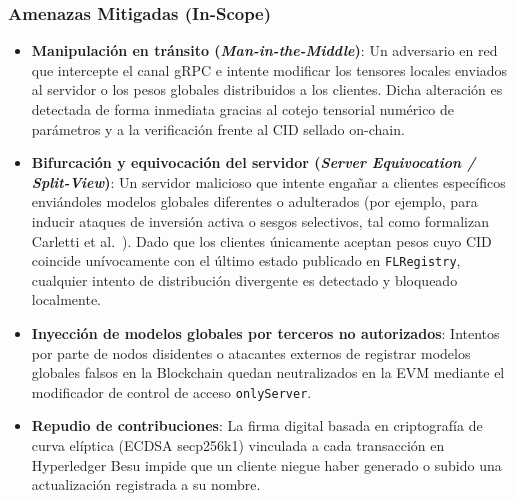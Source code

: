 \subsubsection{Amenazas Mitigadas (In-Scope)}
\begin{itemize}
    \item \textbf{Manipulación en tránsito (\textit{Man-in-the-Middle})}: Un adversario en red que intercepte el canal gRPC e intente modificar los tensores locales enviados al servidor o los pesos globales distribuidos a los clientes. Dicha alteración es detectada de forma inmediata gracias al cotejo tensorial numérico de parámetros y a la verificación frente al CID sellado on-chain.
    \item \textbf{Bifurcación y equivocación del servidor (\textit{Server Equivocation / Split-View})}: Un servidor malicioso que intente engañar a clientes específicos enviándoles modelos globales diferentes o adulterados (por ejemplo, para inducir ataques de inversión activa o sesgos selectivos, tal como formalizan Carletti et al.~\cite{carletti2026detectability}). Dado que los clientes únicamente aceptan pesos cuyo CID coincide unívocamente con el último estado publicado en \texttt{FLRegistry}, cualquier intento de distribución divergente es detectado y bloqueado localmente.
    \item \textbf{Inyección de modelos globales por terceros no autorizados}: Intentos por parte de nodos disidentes o atacantes externos de registrar modelos globales falsos en la Blockchain quedan neutralizados en la EVM mediante el modificador de control de acceso \texttt{onlyServer}.
    \item \textbf{Repudio de contribuciones}: La firma digital basada en criptografía de curva elíptica (ECDSA secp256k1) vinculada a cada transacción en Hyperledger Besu impide que un cliente niegue haber generado o subido una actualización registrada a su nombre.
\end{itemize}


